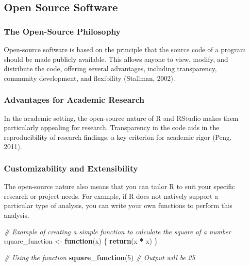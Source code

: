 \documentclass[
  b5paper]{book}
\newenvironment{Shaded}{\begin{snugshade}}{\end{snugshade}}
\newcommand{\CommentTok}[1]{\textcolor[rgb]{0.56,0.35,0.01}{\textit{#1}}}
\newcommand{\ControlFlowTok}[1]{\textcolor[rgb]{0.13,0.29,0.53}{\textbf{#1}}}
\newcommand{\DecValTok}[1]{\textcolor[rgb]{0.00,0.00,0.81}{#1}}
\newcommand{\FunctionTok}[1]{\textcolor[rgb]{0.13,0.29,0.53}{\textbf{#1}}}
\newcommand{\NormalTok}[1]{#1}
\newcommand{\OtherTok}[1]{\textcolor[rgb]{0.56,0.35,0.01}{#1}}
\newcommand{\SpecialCharTok}[1]{\textcolor[rgb]{0.81,0.36,0.00}{\textbf{#1}}}
\begin{document}
\hypertarget{open-source-software}{%
\subsection*{Open Source Software}\label{open-source-software}}

\hypertarget{the-open-source-philosophy}{%
\subsubsection*{The Open-Source Philosophy}\label{the-open-source-philosophy}}

Open-source software is based on the principle that the source code of a program should be made publicly available. This allows anyone to view, modify, and distribute the code, offering several advantages, including transparency, community development, and flexibility (Stallman, 2002).

\hypertarget{advantages-for-academic-research}{%
\subsubsection*{Advantages for Academic Research}\label{advantages-for-academic-research}}

In the academic setting, the open-source nature of R and RStudio makes them particularly appealing for research. Transparency in the code aids in the reproducibility of research findings, a key criterion for academic rigor (Peng, 2011).

\hypertarget{customizability-and-extensibility}{%
\subsubsection*{Customizability and Extensibility}\label{customizability-and-extensibility}}

The open-source nature also means that you can tailor R to suit your specific research or project needs. For example, if R does not natively support a particular type of analysis, you can write your own functions to perform this analysis.

\begin{Shaded}
\begin{Highlighting}[]
\CommentTok{\# Example of creating a simple function to calculate the square of a number}
\NormalTok{square\_function }\OtherTok{\textless{}{-}} \ControlFlowTok{function}\NormalTok{(x) \{}
  \FunctionTok{return}\NormalTok{(x }\SpecialCharTok{*}\NormalTok{ x)}
\NormalTok{\}}

\CommentTok{\# Using the function}
\FunctionTok{square\_function}\NormalTok{(}\DecValTok{5}\NormalTok{)  }\CommentTok{\# Output will be 25}
\end{Highlighting}
\end{Shaded}
\end{document}
